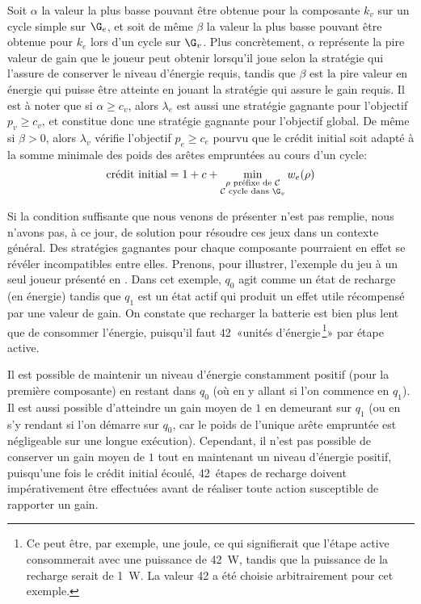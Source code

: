 Soit $\alpha$ la valeur la plus basse pouvant être obtenue pour la composante $k_v$ sur un cycle simple sur $\G_e$, et soit de même $\beta$ la valeur la plus basse pouvant être obtenue pour $k_e$ lors d'un cycle sur $\G_v$.
Plus concrètement, $\alpha$ représente la pire valeur de gain que le joueur peut obtenir lorsqu'il joue selon la stratégie qui l'assure de conserver le niveau d'énergie requis, tandis que $\beta$ est la pire valeur en énergie qui puisse être atteinte en jouant la stratégie qui assure le gain requis.
Il est à noter que si $\alpha \geq c_v$, alors $\lambda_e$ est aussi une stratégie gagnante pour l'objectif $p_v \geq c_v$, et constitue donc une stratégie gagnante pour l'objectif global.
De même si $\beta > 0$, alors $\lambda_v$ vérifie l'objectif $p_e \geq c_e$ pourvu que le crédit initial soit adapté à la somme minimale des poids des arêtes empruntées au cours d'un cycle:
\[\textrm{crédit initial} = 1+c+\min_{\substack{\rho \textrm{ préfixe de } \mathcal{C}\\
\mathcal{C}\textrm{ cycle dans } \G_v}} w_e(\rho)\]

\medskip

Si la condition suffisante que nous venons de présenter n'est pas remplie, nous n'avons pas, à ce jour, de solution pour résoudre ces jeux dans un contexte général.
Des stratégies gagnantes pour chaque composante pourraient en effet se révéler incompatibles entre elles.
Prenons, pour illustrer, l'exemple du jeu à un seul joueur présenté en .
Dans cet exemple, $q_0$ agit comme un état de recharge (en énergie) tandis que $q_1$ est un état actif qui produit un effet utile récompensé par une valeur de gain.
On constate que recharger la batterie est bien plus lent que de consommer l'énergie, puisqu'il faut 42 «unités d'énergie\,\footnote{Ce peut être, par exemple, une joule, ce qui signifierait que l'étape active consommerait avec une puissance de 42~W, tandis que la puissance de la recharge serait de 1~W. La valeur 42 a été choisie arbitrairement pour cet exemple.}» par étape active.

Il est possible de maintenir un niveau d'énergie constamment positif (pour la première composante) en restant dans $q_0$ (où en y allant si l'on commence en $q_1$).
Il est aussi possible d'atteindre un gain moyen de $1$ en demeurant sur $q_1$ (ou en s'y rendant si l'on démarre sur $q_0$, car le poids de l'unique arête empruntée est négligeable sur une longue exécution).
Cependant, il n'est pas possible de conserver un gain moyen de $1$ tout en maintenant un niveau d'énergie positif, puisqu'une fois le crédit initial écoulé, 42~étapes de recharge doivent impérativement être effectuées avant de réaliser toute action susceptible de rapporter un gain.

